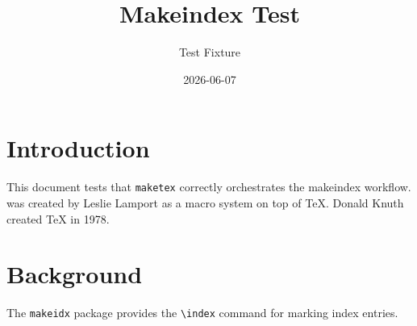 \documentclass{article}
\title{Makeindex Test}
\author{Test Fixture}
\date{2026-06-07}
\begin{document}
\maketitle

\section{Introduction}
This document tests that \texttt{maketex} correctly orchestrates the
makeindex workflow.  was created by Leslie Lamport
 as a macro system on top of \TeX.
 Donald Knuth  created \TeX{} in 1978.

\section{Background}
The \texttt{makeidx}  package provides the
\verb|\index|  command for marking index entries.

\printindex
\end{document}

